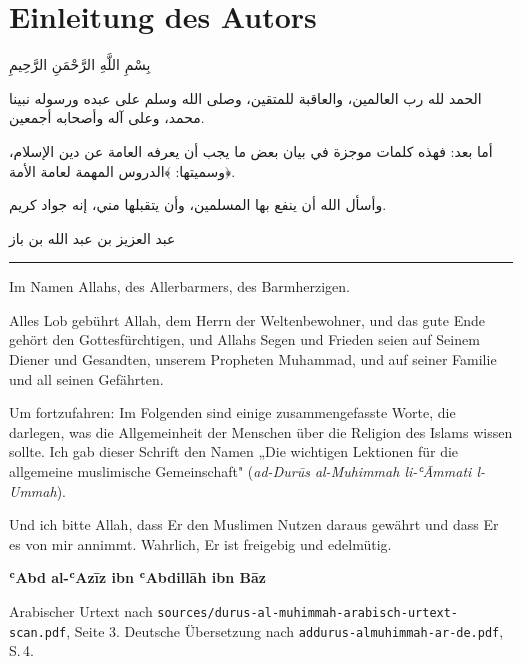 \clearpage
\thispagestyle{plain}
\section*{Einleitung des Autors}

\begin{center}
{\arabicfont\fontsize{15}{20}\selectfont\begin{Arabic}بِسْمِ اللَّهِ الرَّحْمَنِ الرَّحِيمِ\end{Arabic}}
\end{center}

\begin{center}
{\arabicfont\fontsize{13}{18}\selectfont\begin{Arabic}
الحمد لله رب العالمين، والعاقبة للمتقين، وصلى الله وسلم على عبده ورسوله نبينا محمد، وعلى آله
وأصحابه أجمعين.

أما بعد: فهذه كلمات موجزة في بيان بعض ما يجب أن يعرفه العامة عن دين الإسلام، وسميتها:
﴾الدروس المهمة لعامة الأمة﴿.

وأسأل الله أن ينفع بها المسلمين، وأن يتقبلها مني، إنه جواد كريم.
\end{Arabic}}
\end{center}

\begin{flushright}
{\arabicfont\begin{Arabic}عبد العزيز بن عبد الله بن باز\end{Arabic}}
\end{flushright}

\vspace{1.5em}
\begin{center}\color{MutedText}\rule{28mm}{0.4pt}\end{center}
\vspace{1em}

Im Namen Allahs, des Allerbarmers, des Barmherzigen.

Alles Lob gebührt Allah, dem Herrn der Weltenbewohner, und das gute Ende gehört den
Gottesfürchtigen, und Allahs Segen und Frieden seien auf Seinem Diener und Gesandten, unserem
Propheten Muhammad, und auf seiner Familie und all seinen Gefährten.

Um fortzufahren: Im Folgenden sind einige zusammengefasste Worte, die darlegen, was die
Allgemeinheit der Menschen über die Religion des Islams wissen sollte. Ich gab dieser Schrift den
Namen „Die wichtigen Lektionen für die allgemeine muslimische Gemeinschaft" (\emph{ad-Durūs
al-Muhimmah li-ʿĀmmati l-Ummah}).

Und ich bitte Allah, dass Er den Muslimen Nutzen daraus gewährt und dass Er es von mir annimmt.
Wahrlich, Er ist freigebig und edelmütig.

\vspace{1em}
\begin{flushright}
\textbf{ʿAbd al-ʿAzīz ibn ʿAbdillāh ibn Bāz} 
\end{flushright}

\vspace{0.5em}
{\small\color{MutedText}Arabischer Urtext nach \texttt{sources/durus-al-muhimmah-arabisch-urtext-scan.pdf},
Seite 3. Deutsche Übersetzung nach \texttt{addurus-almuhimmah-ar-de.pdf}, S.\,4.}
\clearpage
